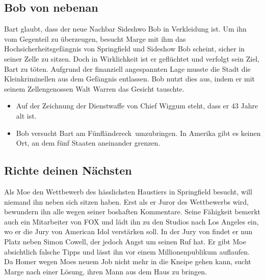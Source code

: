 
\subsection{Bob von nebenan}
Bart glaubt, dass der neue Nachbar Sideshwo Bob in Verkleidung ist. Um ihn vom Gegenteil zu überzeugen, besucht Marge mit ihm das Hochsicherheitsgefängnis von Springfield und Sideshow Bob scheint, sicher in seiner Zelle zu sitzen. Doch in Wirklichkeit ist er geflüchtet und verfolgt sein Ziel, Bart zu töten. Aufgrund der finanziell angespannten Lage musste die Stadt die Kleinkriminellen aus dem Gefängnis entlassen. Bob nutzt dies aus, indem er mit seinem Zellengenossen Walt Warren das Gesicht tauschte.

\begin{itemize}
	\item Auf der Zeichnung der Dienstwaffe von Chief Wiggum steht, dass er 43 Jahre alt ist.
	\item Bob versucht Bart am \glqq Fünfländereck\grqq\ umzubringen. In Amerika gibt es keinen Ort, an dem fünf Staaten aneinander grenzen.
\end{itemize}

\subsection{Richte deinen Nächsten}
Als Moe den Wettbewerb des hässlichsten Haustiers in Springfield besucht, will niemand ihn neben sich sitzen haben. Erst als er Juror des Wettbewerbs wird, bewundern ihn alle wegen seiner boshaften Kommentare. Seine Fähigkeit bemerkt auch ein Mitarbeiter von FOX und lädt ihn zu den Studios nach Los Angeles ein, wo er die Jury von American Idol verstärken soll. In der Jury von findet er nun Platz neben Simon Cowell, der jedoch Angst um seinen Ruf hat. Er gibt Moe absichtlich falsche Tipps und lässt ihn vor einem Millionenpublikum auflaufen. Da Homer wegen Moes neuem Job nicht mehr in die Kneipe gehen kann, sucht Marge nach einer Lösung, ihren Mann aus dem Haus zu bringen.

